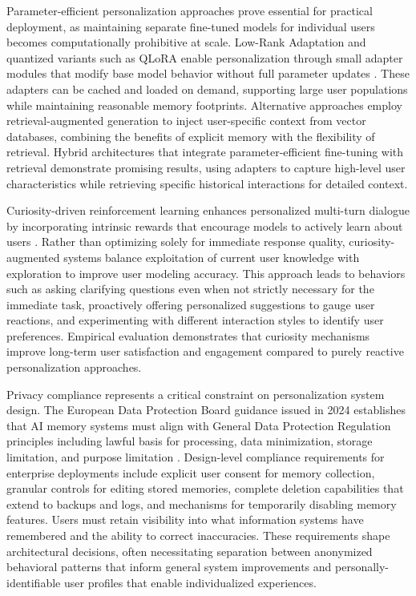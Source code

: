 \documentclass[11pt,letterpaper]{article}
\begin{document}
Parameter-efficient personalization approaches prove essential for practical deployment, as maintaining separate fine-tuned models for individual users becomes computationally prohibitive at scale. Low-Rank Adaptation and quantized variants such as QLoRA enable personalization through small adapter modules that modify base model behavior without full parameter updates \cite{together2024finetune}. These adapters can be cached and loaded on demand, supporting large user populations while maintaining reasonable memory footprints. Alternative approaches employ retrieval-augmented generation to inject user-specific context from vector databases, combining the benefits of explicit memory with the flexibility of retrieval. Hybrid architectures that integrate parameter-efficient fine-tuning with retrieval demonstrate promising results, using adapters to capture high-level user characteristics while retrieving specific historical interactions for detailed context.

Curiosity-driven reinforcement learning enhances personalized multi-turn dialogue by incorporating intrinsic rewards that encourage models to actively learn about users \cite{zhang2024curiosity}. Rather than optimizing solely for immediate response quality, curiosity-augmented systems balance exploitation of current user knowledge with exploration to improve user modeling accuracy. This approach leads to behaviors such as asking clarifying questions even when not strictly necessary for the immediate task, proactively offering personalized suggestions to gauge user reactions, and experimenting with different interaction styles to identify user preferences. Empirical evaluation demonstrates that curiosity mechanisms improve long-term user satisfaction and engagement compared to purely reactive personalization approaches.

Privacy compliance represents a critical constraint on personalization system design. The European Data Protection Board guidance issued in 2024 establishes that AI memory systems must align with General Data Protection Regulation principles including lawful basis for processing, data minimization, storage limitation, and purpose limitation \cite{edpb2024guidance}. Design-level compliance requirements for enterprise deployments include explicit user consent for memory collection, granular controls for editing stored memories, complete deletion capabilities that extend to backups and logs, and mechanisms for temporarily disabling memory features. Users must retain visibility into what information systems have remembered and the ability to correct inaccuracies. These requirements shape architectural decisions, often necessitating separation between anonymized behavioral patterns that inform general system improvements and personally-identifiable user profiles that enable individualized experiences.
\end{document}
